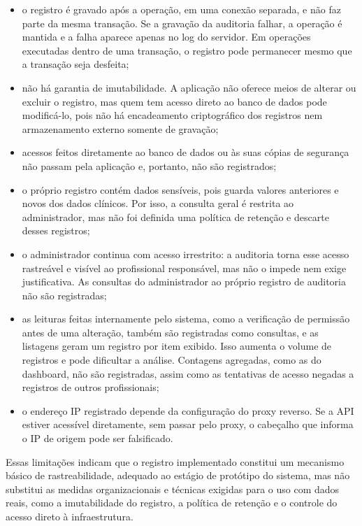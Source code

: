 \begin{itemize}
    \item o registro é gravado após a operação, em uma conexão separada, e não faz parte da mesma transação. Se a gravação da auditoria falhar, a operação é mantida e a falha aparece apenas no log do servidor. Em operações executadas dentro de uma transação, o registro pode permanecer mesmo que a transação seja desfeita;
    \item não há garantia de imutabilidade. A aplicação não oferece meios de alterar ou excluir o registro, mas quem tem acesso direto ao banco de dados pode modificá-lo, pois não há encadeamento criptográfico dos registros nem armazenamento externo somente de gravação;
    \item acessos feitos diretamente ao banco de dados ou às suas cópias de segurança não passam pela aplicação e, portanto, não são registrados;
    \item o próprio registro contém dados sensíveis, pois guarda valores anteriores e novos dos dados clínicos. Por isso, a consulta geral é restrita ao administrador, mas não foi definida uma política de retenção e descarte desses registros;
    \item o administrador continua com acesso irrestrito: a auditoria torna esse acesso rastreável e visível ao profissional responsável, mas não o impede nem exige justificativa. As consultas do administrador ao próprio registro de auditoria não são registradas;
    \item as leituras feitas internamente pelo sistema, como a verificação de permissão antes de uma alteração, também são registradas como consultas, e as listagens geram um registro por item exibido. Isso aumenta o volume de registros e pode dificultar a análise. Contagens agregadas, como as do dashboard, não são registradas, assim como as tentativas de acesso negadas a registros de outros profissionais;
    \item o endereço IP registrado depende da configuração do proxy reverso. Se a API estiver acessível diretamente, sem passar pelo proxy, o cabeçalho que informa o IP de origem pode ser falsificado.
\end{itemize}

Essas limitações indicam que o registro implementado constitui um mecanismo básico de rastreabilidade, adequado ao estágio de protótipo do sistema, mas não substitui as medidas organizacionais e técnicas exigidas para o uso com dados reais, como a imutabilidade do registro, a política de retenção e o controle do acesso direto à infraestrutura.

